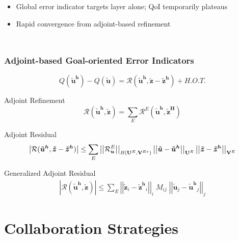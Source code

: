 \documentclass[mathserif]{beamer}
\newcommand{\abs}[1]{\ensuremath{ \left|#1\right|}}
\newcommand{\norm}[1]{\ensuremath{ \left|\left|#1\right|\right|}}
\newcommand{\bv}[1]{{\boldsymbol{#1}}}
\newcommand{\Qoi}{{\ensuremath{Q}}}
\newcommand{\Res}{{\ensuremath{\mathcal R}}}
\newcommand{\Unknowns}{{\ensuremath{\bf{U}}}}
\newcommand{\unknown}{{\ensuremath{\bv{u}}}}
\newcommand{\Testfuncs}{{\ensuremath{\bf{V}}}}
\newcommand{\primalsol}{{\ensuremath{\bv{\tilde{u}}}}}
\newcommand{\primalsolh}{{\ensuremath{\bv{\tilde{u}^h}}}}
\newcommand{\adjointsol}{{\ensuremath{\bv{\tilde{z}}}}}
\newcommand{\adjointsolh}{{\ensuremath{\bv{\tilde{z}^h}}}}
\newcommand{\adjointsolH}{{\ensuremath{\bv{\tilde{z}^H}}}}
\newcommand{\elem}{\ensuremath{E}}
\begin{document}
\begin{frame}
\begin{columns}
\begin{itemize}
\item Global error indicator targets layer alone; QoI temporarily plateaus
\item Rapid convergence from adjoint-based refinement
\end{itemize}

\end{columns}

\end{frame}


\begin{frame}
\frametitle{Adjoint-based Goal-oriented Error Indicators}

\begin{equation*}
\Qoi(\primalsolh) - \Qoi(\primalsol) = \Res(\primalsolh, \adjointsol - \adjointsolh) + H.O.T.
\end{equation*}

\begin{block}{Adjoint Refinement}
\begin{equation*}
\Res(\primalsolh, \adjointsol) = \sum_\elem 
\Res^\elem(\primalsolh, \adjointsolH)
\end{equation*}
\end{block}

\begin{block}{Adjoint Residual}
\begin{equation*}
\abs{\Res(\primalsolh, \adjointsol - \adjointsolh)} \leq
\sum_\elem \norm{\Res^\elem_\unknown}_{B(\Unknowns^\elem,
\Testfuncs^{\elem *})}
\norm{\primalsol - \primalsolh}_{\Unknowns^\elem}
\norm{\adjointsol - \adjointsolh}_{\Testfuncs^\elem}
\end{equation*}
\end{block}

\begin{block}{Generalized Adjoint Residual}
\begin{align*}
\abs{\Res(\primalsolh, \adjointsol)}
\leq \sum_\elem \norm{\adjointsol_i-\adjointsolh_i}_i \; M_{ij} \; \norm{\primalsol_j-\primalsolh_j
}_j \nonumber
\end{align*}
\end{block}

\end{frame}



\section{Collaboration Strategies}
\end{document}
